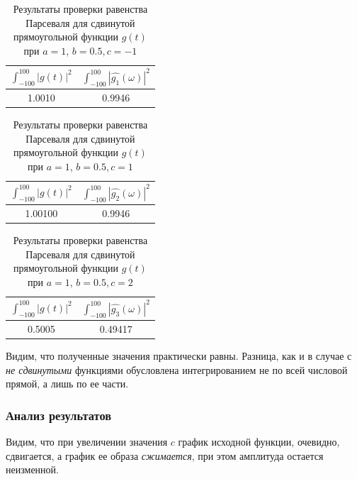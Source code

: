 \begin{table}[ht!]
    \centering
    \begin{tabular}{|c|c|}
        \hline
        $\displaystyle\int_{-100}^{100}{|g(t)|^2}$ & $\displaystyle\int_{-100}^{100}{|\hat{g_1}(\omega)|^2}$ \\
        \hline
        1.0010 & 0.9946 \\
        \hline
    \end{tabular}
    \caption{Результаты проверки равенства Парсеваля для сдвинутой прямоугольной функции $g(t)$ при $a = 1$, $b = 0.5, c = -1$}
    \label{tab:moved_rectangle_1_parseval_check}
\end{table}

\begin{table}[ht!]
    \centering
    \begin{tabular}{|c|c|}
        \hline
        $\displaystyle\int_{-100}^{100}{|g(t)|^2}$ & $\displaystyle\int_{-100}^{100}{|\hat{g_2}(\omega)|^2}$ \\
        \hline
        1.00100 & 0.9946 \\
        \hline
    \end{tabular}
    \caption{Результаты проверки равенства Парсеваля для сдвинутой прямоугольной функции $g(t)$ при $a = 1$, $b = 0.5, c = 1$}
    \label{tab:moved_rectangle_2_parseval_check}
\end{table}

\begin{table}[ht!]
    \centering
    \begin{tabular}{|c|c|}
        \hline
        $\displaystyle\int_{-100}^{100}{|g(t)|^2}$ & $\displaystyle\int_{-100}^{100}{|\hat{g_3}(\omega)|^2}$ \\
        \hline
        0.5005 & 0.49417 \\
        \hline
    \end{tabular}
    \caption{Результаты проверки равенства Парсеваля для сдвинутой прямоугольной функции $g(t)$ при $a = 1$, $b = 0.5, c = 2$}
    \label{tab:moved_rectangle_3_parseval_check}
\end{table}
Видим, что полученные значения практически равны. Разница, как и в случае с \textit{не сдвинутыми} функциями обусловлена интегрированием не по всей числовой прямой, а лишь по ее части.

\subsubsection{Анализ результатов}
Видим, что при увеличении значения $c$ график исходной функции, очевидно, сдвигается, а график ее образа \textit{сжимается}, при этом амплитуда остается неизменной. 